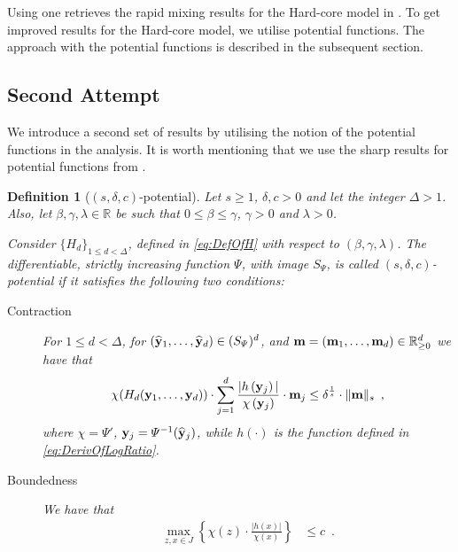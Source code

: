 \documentclass[11pt,reqno]{amsart}
\numberwithin{equation}{section}
\newtheorem{definition}[theorem]{Definition}
\newcommand{\blue}[1]{{\color{blue}#1}}
\newcommand{\cadmiumgreen}[1]{{\color{cadmiumgreen}#1}}
\newcommand{\cadmiumorange}[1]{{\color{cadmiumorange}#1}}
\newcommand{\darkmagenta}[1]{{\color{darkmagenta}#1}}
\newcommand{\goldenbrown}[1]{{\color{goldenbrown}#1}}
\newcommand{\heliotrope}[1]{{\color{heliotrope}#1}}
\newcommand{\maxDeg}{{\Delta}}
\newcommand{\potF}{{\Psi}}
\newcommand{\xdpotF}{\chi}
\newcommand{\pfs}{\darkmagenta{s}}
\newcommand{\logtrecur}{H}
\newcommand{\dlogtrecur}{h}
\newcommand{\ratiorange}{J}
\newcommand{\norm}[2]{\goldenbrown{\|} #1 \goldenbrown{\|}_{#2}}
\newcommand{\abs}[1]{\blue{|}#1\blue{|}}
\renewcommand{\blue}[1]{#1}
\renewcommand{\cadmiumgreen}[1]{#1}
\renewcommand{\cadmiumorange}[1]{#1}
\renewcommand{\darkmagenta}[1]{#1}
\renewcommand{\goldenbrown}[1]{#1}
\renewcommand{\heliotrope}[1]{#1}
\newcommand{\kd}{\goldenbrown{d}}
\newcommand{\kx}{\heliotrope{x}}
\newcommand{\ky}{\cadmiumorange{y}}%
\newcommand{\kz}{\cadmiumgreen{z}}
\renewcommand{\kd}{d}
\renewcommand{\kx}{x}
\renewcommand{\ky}{\cadmiumgreen{y}}
\renewcommand{\kz}{z}
\begin{document}
Using     one retrieves the rapid mixing  results for the Hard-core model in \cite{Hayes06}. 
To get  improved results for the  Hard-core model, we utilise potential functions. The approach with the potential functions is
described in the subsequent section. 





\subsection{Second Attempt}\label{sec:SISecondAttempt}

We introduce a second set of results by utilising the notion of the potential functions in the analysis.
It is worth mentioning that we use the sharp results for potential functions from \cite{ConnectiveConst}.



\begin{definition}[$(\pfs,\delta, c)$-potential]\label{def:GoodPotential}
Let $s\geq 1$, $\delta,c>0$ and let the integer $\maxDeg> 1$. 
Also, let $\beta,\gamma, \lambda\in \mathbb{R}$ be such that $0\leq \beta\leq \gamma$, 
$\gamma >0$ and $\lambda>0$. 

 

Consider $\{ \logtrecur_{\kd}\}_{1\leq \kd< \Delta}$, defined in \eqref{eq:DefOfH} with respect to 
$(\beta,\gamma,\lambda)$. The differentiable, strictly increasing function $\potF$, with image $S_{\potF}$, is called $(\pfs, \delta, c)$-potential 
if it satisfies the following two conditions: 
\begin{description}
\item[Contraction]
For $1\leq \kd< \maxDeg$, for $(\widehat{\bf \ky}_1, \ldots, \widehat{\bf \ky}_{\kd})\in (S_{\potF})^{\kd}$, 
 and ${\bf m}=({\bf m}_1, \ldots, {\bf m}_{\kd})\in \mathbb{R}^{\kd}_{ \geq 0}$ we have that 
\begin{align} \label{eq:contractionRelationPF}
 \xdpotF( \logtrecur_d({\bf \ky}_1, \ldots, {\bf \ky}_{\kd}) ) \cdot \sum^{\kd}_{j=1}
\frac{ \abs{ \dlogtrecur\left({\bf \ky}_j \right)}}{ \xdpotF\left( {\bf \ky}_j \right)} \cdot {\bf m}_j \leq \delta^{\frac{1}{\pfs}} \cdot \norm{ {\bf m}}{\pfs} 
\enspace ,
\end{align}
where $\xdpotF=\potF'$, ${\bf \ky}_j=\potF^{-1}(\widehat{\bf \ky}_j)$, while $\dlogtrecur(\cdot)$ is the function defined in \eqref{eq:DerivOfLogRatio}.
\item[Boundedness] We have that
\begin{align}\label{eq:BoundednessPF}
  \max_{\kz,\kx\in \ratiorange}\left\{ \xdpotF(\kz) \cdot \frac{\abs{\dlogtrecur(\kx)}}{\xdpotF(\kx)} \right\} & \leq c \enspace.
\end{align}
\end{description}
\end{definition}
\end{document}
